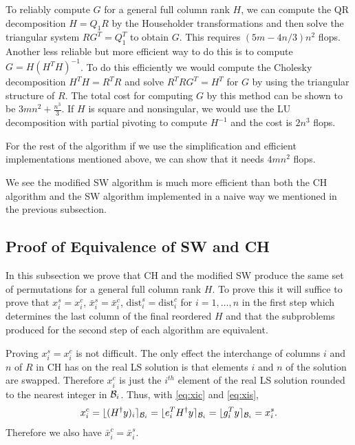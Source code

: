 \documentclass[12pt,Bold,letterpaper]{mcgilletdclass}
\newcommand{\be}{\begin{equation}}
\newcommand{\ee}{\end{equation}}
\newcommand{\dist}{\mathrm{dist}}
\newcommand{\vsp}{\vspace{\baselineskip}}
\begin{document}
To reliably compute $G$ for a general full column rank $H$,
we can compute the  QR decomposition $H=Q_1R$ by the Householder transformations
and then solve the triangular system  $RG^T=Q_1^T$ to obtain $G$.
This requires $(5m-4n/3)n^2$ flops. 
Another less reliable but more efficient way to do this is to compute $G=H(H^TH)^{-1}$. 
To do this efficiently we would compute the Cholesky decomposition  $H^TH = R^TR$ and solve 
$R^TRG^T = H^T$ for $G$ by using the triangular structure of $R$. 
The total cost for computing $G$ by this method can be shown to be $3mn^2+\frac{n^3}{3}$.
If $H$ is square and nonsingular, we would use the LU decomposition with partial pivoting to compute $H^{-1}$
and the cost is $2n^3$ flops.

For the rest of the algorithm if we use the simplification and efficient implementations
mentioned above, we can show that it needs $4mn^2$ flops. 

We see the modified SW algorithm is much more efficient than both the CH algorithm
and the SW algorithm implemented in a naive way we mentioned in the previous subsection.

\vsp \subsection{Proof of Equivalence of SW and CH}
In this subsection we prove that  CH and  the modified  SW produce the same set of permutations
for a general full column rank $H$.
To prove this it will suffice to prove that $x_i^s = x_i^c$, $\bar{x}_i^s =\bar{x}_i^c$,
$\dist_i^s = \dist_i^c$ for $i=1, \ldots, n$ in the first step which determines the last column of the final reordered $H$
and that the subproblems produced for the second step of
each algorithm are equivalent. 

Proving $x_i^s = x_i^c$ is not difficult.
The only effect the interchange of columns $i$  and $n$ of $R$ in CH  
has on the real LS solution is that elements $i$ and $n$ of the solution are swapped.
Therefore $x_i^c$ is just the $i^{th}$ element of the real LS
solution rounded to the nearest integer in ${{\cal B}_i }$. 
Thus, with \eqref{eq:xic} and \eqref{eq:xis},
\be
x_i^c=   \lfloor (H^{\dagger}y)_i  \rceil_{{\cal B}_i }
=  \lfloor e_i^T H^{\dagger}y   \rceil_{{\cal B}_i }
=  \lfloor g_i^T  y \rceil_{{\cal B}_i } =x_i^s.
\label{eq:xics}
\ee
Therefore we also have $\bar{x}_i^c=\bar{x}_i^s$.
\end{document}
